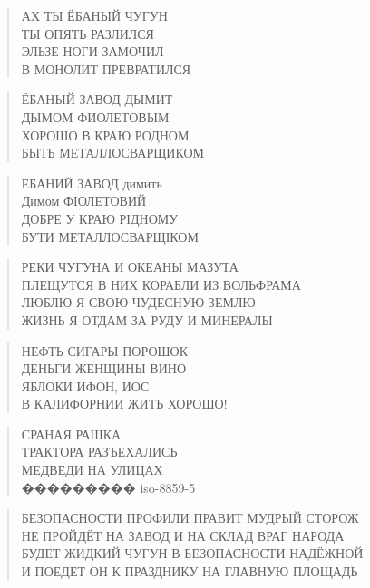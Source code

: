 \poemtitle{***}
\begin{verse}
АХ ТЫ ЁБАНЫЙ ЧУГУН\\
ТЫ ОПЯТЬ РАЗЛИЛСЯ\\
ЭЛЬЗЕ НОГИ ЗАМОЧИЛ\\
В МОНОЛИТ ПРЕВРАТИЛСЯ
\end{verse}

\poemtitle{***}
\begin{verse}
ЁБАНЫЙ ЗАВОД ДЫМИТ\\
ДЫМОМ ФИОЛЕТОВЫМ\\
ХОРОШО В КРАЮ РОДНОМ\\
БЫТЬ МЕТАЛЛОСВАРЩИКОМ
\end{verse}

\poemtitle{***}
\begin{verse}
ЕБАНИЙ ЗАВОД димить\\
Димом ФІОЛЕТОВИЙ\\
ДОБРЕ У КРАЮ РІДНОМУ\\
БУТИ МЕТАЛЛОСВАРЩІКОМ
\end{verse}

\poemtitle{***}
\begin{verse}
РЕКИ ЧУГУНА И ОКЕАНЫ МАЗУТА\\
ПЛЕЩУТСЯ В НИХ КОРАБЛИ ИЗ ВОЛЬФРАМА\\
ЛЮБЛЮ Я СВОЮ ЧУДЕСНУЮ ЗЕМЛЮ\\
ЖИЗНЬ Я ОТДАМ ЗА РУДУ И МИНЕРАЛЫ
\end{verse}

\poemtitle{***}
\begin{verse}
НЕФТЬ СИГАРЫ ПОРОШОК\\
ДЕНЬГИ ЖЕНЩИНЫ ВИНО\\
ЯБЛОКИ ИФОН, ИОС\\
В КАЛИФОРНИИ ЖИТЬ ХОРОШО!
\end{verse}

\poemtitle{***}
\begin{verse}
СРАНАЯ РАШКА\\
ТРАКТОРА РАЗЪЕХАЛИСЬ\\
МЕДВЕДИ НА УЛИЦАХ\\
���������  iso-8859-5
\end{verse}

\poemtitle{***}
\begin{verse}
БЕЗОПАСНОСТИ ПРОФИЛИ ПРАВИТ МУДРЫЙ СТОРОЖ\\
НЕ ПРОЙДЁТ НА ЗАВОД И НА СКЛАД ВРАГ НАРОДА\\
БУДЕТ ЖИДКИЙ ЧУГУН В БЕЗОПАСНОСТИ НАДЁЖНОЙ\\
И ПОЕДЕТ ОН К ПРАЗДНИКУ НА ГЛАВНУЮ ПЛОЩАДЬ
\end{verse}

